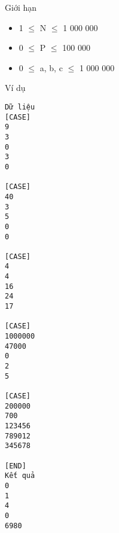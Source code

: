 Giới hạn  
\begin{itemize}
	\item     1  $\le$  N  $\le$  1 000 000   
	\item     0  $\le$  P  $\le$  100 000   
	\item     0  $\le$  a, b, c  $\le$  1 000 000   
\end{itemize}
   Ví dụ  
\begin{verbatim}
Dữ liệu
[CASE]
9
3
0
3
0

[CASE]
40
3
5
0
0

[CASE]
4
4
16
24
17
    	
[CASE]
1000000
47000
0
2
5

[CASE]
200000
700
123456
789012
345678

[END]
Kết quả
0
1
4
0
6980
\end{verbatim}